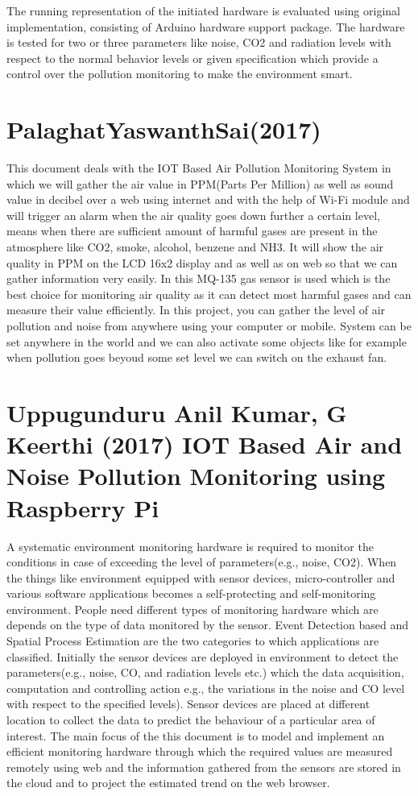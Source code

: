 The running representation of the initiated hardware is evaluated using original implementation, consisting of Arduino hardware support package. The hardware is tested for two or three parameters like noise, CO2 and radiation levels with respect to the normal behavior levels or given specification which provide a control over the pollution monitoring to make the environment smart.



\section{PalaghatYaswanthSai(2017)}
This document deals with the IOT Based Air Pollution Monitoring System in which we will gather the air value in PPM(Parts Per Million) as well as sound value in decibel over a web using internet and with the help of Wi-Fi module and will trigger an alarm when the air quality goes down further a certain level, means when there are sufficient amount of harmful gases are present in the atmosphere like CO2, smoke, alcohol, benzene and NH3. It will show the air quality in PPM on the LCD 16x2 display and as well as on web so that we can gather information very easily. In this MQ-135 gas sensor is used which is the best choice for monitoring air quality as it can detect most harmful gases and can measure their value efficiently. In this project, you can gather the level of air pollution and noise from anywhere using your computer or mobile. System can be set anywhere in the world and we can also activate some objects like for example when pollution goes beyoud some set level we can switch on the exhaust fan.

\section{Uppugunduru Anil Kumar, G Keerthi (2017) IOT Based Air and Noise Pollution Monitoring using Raspberry Pi}

A systematic environment monitoring hardware is required to monitor the conditions in case of exceeding the level of parameters(e.g., noise, CO2). When the things like environment equipped with sensor devices, micro-controller and various software applications becomes a self-protecting and self-monitoring environment. People need different types of monitoring hardware which are depends on the type of data monitored by the sensor. Event Detection based and Spatial Process Estimation are the two categories to which applications are classified. Initially the sensor devices are deployed in environment  to detect the parameters(e.g., noise, CO, and radiation levels etc.) which the data acquisition, computation and controlling action e.g., the variations in the noise and CO level with respect to the specified levels). Sensor devices are placed at different location to collect the data to predict the behaviour of a particular area of interest. The main focus of the this document is to model and implement an efficient monitoring
hardware through which the required values are measured remotely using web and the
information gathered from the sensors are stored in the cloud and to project the estimated
trend on the web browser.


